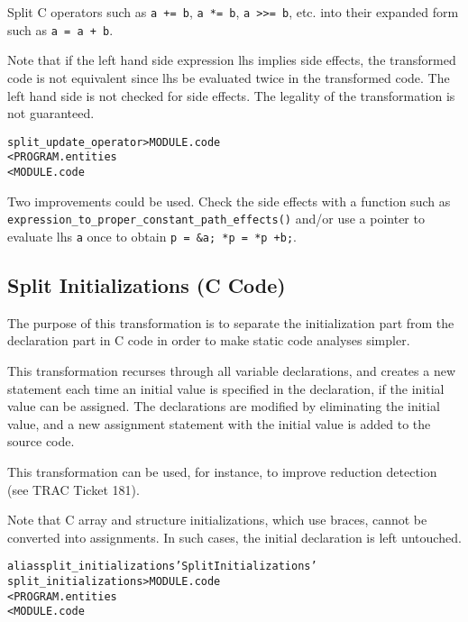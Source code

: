 \documentclass[a4paper]{report}
\newenvironment{PipsMake}{\begin{alltt}}{\end{alltt}}
\newenvironment{PipsPass}[1]{\label{pass:#1}}{}
\begin{document}
\begin{PipsPass}{split_update_operator}
  Split C operators such as \verb/a += b/, \verb/a *= b/, \verb/a >>= b/,
  etc. into their expanded form such as \verb/a = a + b/.
\end{PipsPass}

Note that if the left hand side expression lhs implies side effects,
the transformed code is not equivalent since lhs be evaluated twice in
the transformed code. The left hand side is not checked for side
effects. The legality of the transformation is not guaranteed.

\begin{PipsMake}
split_update_operator > MODULE.code
        < PROGRAM.entities
        < MODULE.code
\end{PipsMake}

Two improvements could be used. Check the side effects with a function
such as \verb/expression_to_proper_constant_path_effects()/ and/or use a
pointer to evaluate lhs \verb/a/ once to obtain
\verb/p = &a; *p = *p +b;/.


\subsection{Split Initializations (C Code)}

\begin{PipsPass}{split_initializations}
The purpose of this transformation is to separate the initialization
part from the declaration part in C code in order to make static code
analyses simpler.
\end{PipsPass}

This transformation recurses through all variable declarations, and
creates a new statement each time an initial value is specified in the
declaration, if the initial value can be assigned. The declarations
are modified by eliminating the initial value, and a new assignment
statement with the initial value is added to the source code.

This transformation can be used, for instance, to improve reduction
detection (see TRAC Ticket 181).

Note that C array and structure initializations, which use braces,
cannot be converted into assignments. In such cases, the initial
declaration is left untouched.

\begin{PipsMake}
alias split_initializations 'Split Initializations'
split_initializations > MODULE.code
        < PROGRAM.entities
        < MODULE.code
\end{PipsMake}
\end{document}
